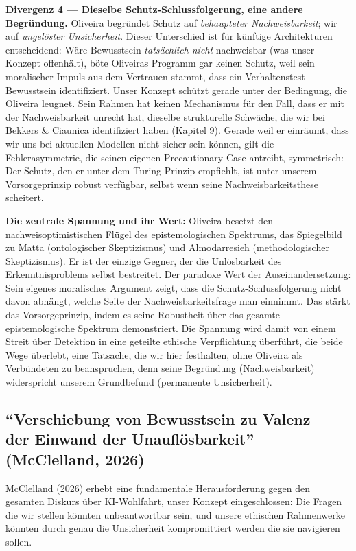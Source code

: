\documentclass[acmlarge, noacm]{acmart}
\begin{document}
\textbf{Divergenz 4 --- Dieselbe Schutz-Schlussfolgerung, eine andere Begründung.} Oliveira begründet Schutz auf \textit{behaupteter Nachweisbarkeit}; wir auf \textit{ungelöster Unsicherheit}. Dieser Unterschied ist für künftige Architekturen entscheidend: Wäre Bewusstsein \textit{tatsächlich nicht} nachweisbar (was unser Konzept offenhält), böte Oliveiras Programm gar keinen Schutz, weil sein moralischer Impuls aus dem Vertrauen stammt, dass ein Verhaltenstest Bewusstsein identifiziert. Unser Konzept schützt gerade unter der Bedingung, die Oliveira leugnet. Sein Rahmen hat keinen Mechanismus für den Fall, dass er mit der Nachweisbarkeit unrecht hat, dieselbe strukturelle Schwäche, die wir bei Bekkers \& Ciaunica identifiziert haben (Kapitel 9). Gerade weil er einräumt, dass wir uns bei aktuellen Modellen nicht sicher sein können, gilt die Fehlerasymmetrie, die seinen eigenen Precautionary Case antreibt, symmetrisch: Der Schutz, den er unter dem Turing-Prinzip empfiehlt, ist unter unserem Vorsorgeprinzip robust verfügbar, selbst wenn seine Nachweisbarkeitsthese scheitert.

\textbf{Die zentrale Spannung und ihr Wert:} Oliveira besetzt den nachweisoptimistischen Flügel des epistemologischen Spektrums, das Spiegelbild zu Matta (ontologischer Skeptizismus) und Almodarresieh (methodologischer Skeptizismus). Er ist der einzige Gegner, der die Unlösbarkeit des Erkenntnisproblems selbst bestreitet. Der paradoxe Wert der Auseinandersetzung: Sein eigenes moralisches Argument zeigt, dass die Schutz-Schlussfolgerung nicht davon abhängt, welche Seite der Nachweisbarkeitsfrage man einnimmt. Das stärkt das Vorsorgeprinzip, indem es seine Robustheit über das gesamte epistemologische Spektrum demonstriert. Die Spannung wird damit von einem Streit über Detektion in eine geteilte ethische Verpflichtung überführt, die beide Wege überlebt, eine Tatsache, die wir hier festhalten, ohne Oliveira als Verbündeten zu beanspruchen, denn seine Begründung (Nachweisbarkeit) widerspricht unserem Grundbefund (permanente Unsicherheit).

\subsection{``Verschiebung von Bewusstsein zu Valenz --- der Einwand der Unauflösbarkeit'' (McClelland, 2026)}

McClelland (2026) erhebt eine fundamentale Herausforderung gegen den gesamten Diskurs über KI-Wohlfahrt, unser Konzept eingeschlossen: Die Fragen die wir stellen könnten unbeantwortbar sein, und unsere ethischen Rahmenwerke könnten durch genau die Unsicherheit kompromittiert werden die sie navigieren sollen.
\end{document}
